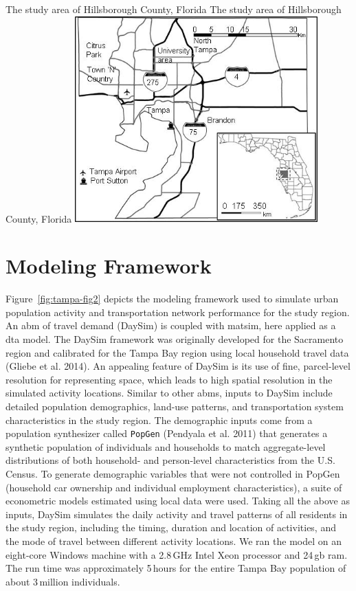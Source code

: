 \createfigure%
{The study area of Hillsborough County, Florida}%
{The study area of Hillsborough County, Florida}%
{\label{fig:tampa-fig1}}%
{\includegraphics[width=0.7\textwidth, angle=0]{./scenarios/figures/tampa-fig1.jpg}}%
{}

\section{Modeling Framework}
Figure~\ref{fig:tampa-fig2} depicts the modeling framework used to simulate urban population activity and transportation network performance for the study region. 
An \gls{abm} of travel demand (DaySim) is coupled with \gls{matsim}, here applied as a \gls{dta} model. 
The DaySim framework was originally developed for the Sacramento region \citep[][]{BradleyEtAl_JOCM_2010} and calibrated for the Tampa Bay region using local household travel data \citep[][]{}(Gliebe et al. 2014). 
An appealing feature of DaySim is its use of fine, parcel-level resolution for representing space, which leads to high spatial resolution in the simulated activity locations.  
Similar to other \glspl{abm}, inputs to DaySim include detailed population demographics, land-use patterns, and transportation system characteristics in the study region. The demographic inputs come from a population synthesizer called \lstinline|PopGen| \citep[][]{}(Pendyala et al. 2011) that generates a synthetic population of individuals and households to match aggregate-level distributions of both household- and person-level characteristics from the U.S. Census. 
To generate demographic variables that were not controlled in PopGen (\eg household car ownership and individual employment characteristics), a suite of econometric models estimated using local data were used. 
Taking all the above as inputs, DaySim simulates the daily activity and travel patterns of all residents in the study region, including the timing, duration and location of activities, and the mode of travel between different activity locations. 
We ran the model on an eight-core Windows machine with a 2.8\,GHz Intel Xeon processor and 24\,\gls{gb} \gls{ram}. 
The run time was approximately 5\,hours for the entire Tampa Bay population of about 3\,million individuals.

